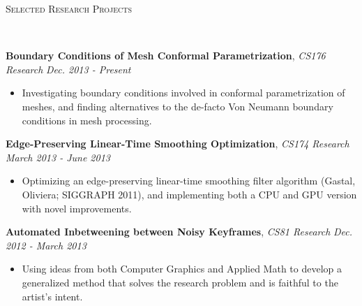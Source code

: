 \documentclass[9pt]{article}
\newenvironment{changemargin}[2]{%
  \begin{list}{}{%
    \setlength{\topsep}{0pt}%
    \setlength{\leftmargin}{#1}%
    \setlength{\rightmargin}{#2}%
    \setlength{\listparindent}{\parindent}%
    \setlength{\itemindent}{\parindent}%
    \setlength{\parsep}{\parskip}%
  }%
  \item[]}{\end{list}
}
\newcommand{\lineover}{
	\begin{changemargin}{-0.05in}{-0.05in}
		\vspace*{-8pt}
		\hrulefill \\
		\vspace*{-2pt}
	\end{changemargin}
}
\newcommand{\header}[1]{
	\begin{changemargin}{-0.5in}{-0.5in}
		\scshape{#1}\\
  	\lineover
	\end{changemargin}
}
\newenvironment{body} {
	\vspace*{-16pt}
	\begin{changemargin}{-0.25in}{-0.5in}
  }	
	{\end{changemargin}
}
\begin{document}
\smallskip




\header{Selected Research Projects}
\smallskip
\begin{body}
	\vspace{14pt}
	\textbf{Boundary Conditions of Mesh Conformal Parametrization}, \emph{CS176 Research} \hfill \emph{Dec. 2013 - Present} \\
	\begin{itemize} \itemsep -0pt
	\item Investigating boundary conditions involved in conformal parametrization of meshes, and finding alternatives to the de-facto Von Neumann boundary conditions in mesh processing.
	\end{itemize}
	
	\textbf{Edge-Preserving Linear-Time Smoothing Optimization}, \emph{CS174 Research} \hfill \emph{March 2013 - June 2013} \\
	\begin{itemize} \itemsep -0pt
		\item Optimizing an edge-preserving linear-time smoothing filter algorithm (Gastal, Oliviera; SIGGRAPH 2011), and implementing both a CPU and GPU version with novel improvements.
	\end{itemize}
	\textbf{Automated Inbetweening between Noisy Keyframes}, \emph{CS81 Research} \hfill \emph{Dec. 2012 - March 2013} \\
	\begin{itemize} \itemsep -0pt
		\item Using ideas from both Computer Graphics and Applied Math to develop a generalized method that solves the research problem and is faithful to the artist's intent.
	\end{itemize}

\end{body}

\smallskip
\end{document}
